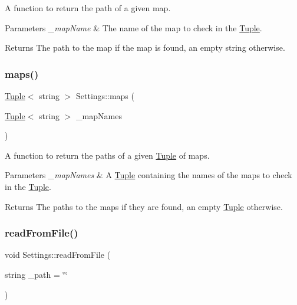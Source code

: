 A function to return the path of a given map. 


\begin{DoxyParams}{Parameters}
{\em \+\_\+map\+Name} & The name of the map to check in the \mbox{\hyperlink{class_tuple}{Tuple}}. \\
\hline
\end{DoxyParams}
\begin{DoxyReturn}{Returns}
The path to the map if the map is found, an empty string otherwise. 
\end{DoxyReturn}
\mbox{\label{class_settings_ab638c9895f57ed5e8ab64084752c660d}} 
\subsubsection{\texorpdfstring{maps()}{maps()}\hspace{0.1cm}{\footnotesize\ttfamily [4/4]}}
{\footnotesize\ttfamily \mbox{\hyperlink{class_tuple}{Tuple}}$<$ string $>$ Settings\+::maps (\begin{DoxyParamCaption}\item[{\mbox{\hyperlink{class_tuple}{Tuple}}$<$ string $>$}]{\+\_\+map\+Names }\end{DoxyParamCaption})}



A function to return the paths of a given \mbox{\hyperlink{class_tuple}{Tuple}} of maps. 


\begin{DoxyParams}{Parameters}
{\em \+\_\+map\+Names} & A \mbox{\hyperlink{class_tuple}{Tuple}} containing the names of the maps to check in the \mbox{\hyperlink{class_tuple}{Tuple}}. \\
\hline
\end{DoxyParams}
\begin{DoxyReturn}{Returns}
The paths to the maps if they are found, an empty \mbox{\hyperlink{class_tuple}{Tuple}} otherwise. 
\end{DoxyReturn}
\mbox{\label{class_settings_a8491d82663ed43dadc540c4a402156fc}} 
\subsubsection{\texorpdfstring{readFromFile()}{readFromFile()}}
{\footnotesize\ttfamily void Settings\+::read\+From\+File (\begin{DoxyParamCaption}\item[{string}]{\+\_\+path = {\ttfamily \char`\"{}\char`\"{}} }\end{DoxyParamCaption})}



